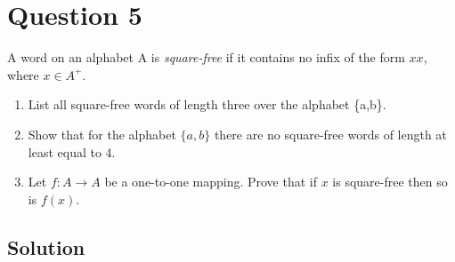 
\section*{Question 5}

A word on an alphabet A is \textit{square-free} if it contains no infix of the form $xx$, where $x \in A^+$.
\begin{enumerate}[label=(\alph*)] 
	\item
	List all square-free words of length three over the alphabet \{a,b\}.

	\item
	Show that for the alphabet $\{a,b\}$ there are no square-free words of length at least equal to 4.

	\item
	Let $f:A \rightarrow A$ be a one-to-one mapping.
	Prove that if $x$ is square-free then so is $f(x)$.

\end{enumerate}

\subsection*{Solution}

